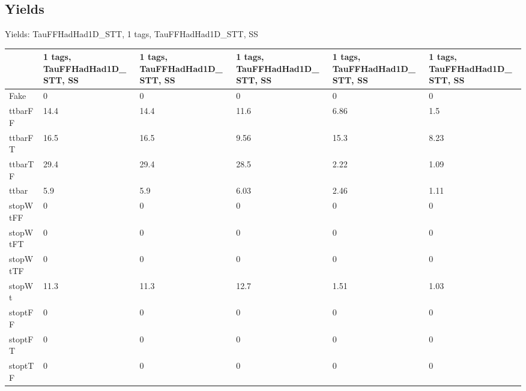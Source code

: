 
\subsection{Yields}

\begin{frame}{Yields: TauFFHadHad1D\_STT, 1 tags, TauFFHadHad1D\_STT, SS}
\begin{center}
  \begin{tabular}{l| >{\centering\let\newline\\\arraybackslash\hspace{0pt}}m{1.4cm}| >{\centering\let\newline\\\arraybackslash\hspace{0pt}}m{1.4cm}| >{\centering\let\newline\\\arraybackslash\hspace{0pt}}m{1.4cm}| >{\centering\let\newline\\\arraybackslash\hspace{0pt}}m{1.4cm}| >{\centering\let\newline\\\arraybackslash\hspace{0pt}}m{1.4cm}}
    & 1 tags, TauFFHadHad1D\_STT, SS & 1 tags, TauFFHadHad1D\_STT, SS & 1 tags, TauFFHadHad1D\_STT, SS & 1 tags, TauFFHadHad1D\_STT, SS & 1 tags, TauFFHadHad1D\_STT, SS \\
 \hline \hline
    Fake& 0 & 0 & 0 & 0 & 0 \\
 \hline
    ttbarFF& 14.4 & 14.4 & 11.6 & 6.86 & 1.5 \\
 \hline
    ttbarFT& 16.5 & 16.5 & 9.56 & 15.3 & 8.23 \\
 \hline
    ttbarTF& 29.4 & 29.4 & 28.5 & 2.22 & 1.09 \\
 \hline
    ttbar& 5.9 & 5.9 & 6.03 & 2.46 & 1.11 \\
 \hline
    stopWtFF& 0 & 0 & 0 & 0 & 0 \\
 \hline
    stopWtFT& 0 & 0 & 0 & 0 & 0 \\
 \hline
    stopWtTF& 0 & 0 & 0 & 0 & 0 \\
 \hline
    stopWt& 11.3 & 11.3 & 12.7 & 1.51 & 1.03 \\
 \hline
    stoptFF& 0 & 0 & 0 & 0 & 0 \\
 \hline
    stoptFT& 0 & 0 & 0 & 0 & 0 \\
 \hline
    stoptTF& 0 & 0 & 0 & 0 & 0 \\

\end{tabular}
\end{center}
\end{frame}
